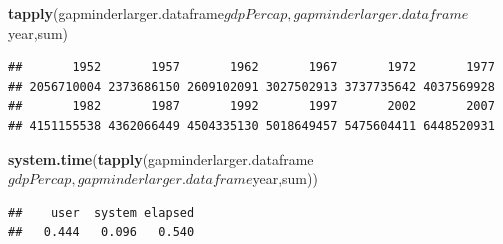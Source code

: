 \documentclass[]{article}
\newenvironment{Shaded}{\begin{snugshade}}{\end{snugshade}}
\newcommand{\KeywordTok}[1]{\textcolor[rgb]{0.13,0.29,0.53}{\textbf{{#1}}}}
\newcommand{\NormalTok}[1]{{#1}}
\begin{document}
\begin{Shaded}
\begin{Highlighting}[]
\KeywordTok{tapply}\NormalTok{(gapminderlarger.dataframe$gdpPercap,gapminderlarger.dataframe$year,sum)}
\end{Highlighting}
\end{Shaded}

\begin{verbatim}
##       1952       1957       1962       1967       1972       1977 
## 2056710004 2373686150 2609102091 3027502913 3737735642 4037569928 
##       1982       1987       1992       1997       2002       2007 
## 4151155538 4362066449 4504335130 5018649457 5475604411 6448520931
\end{verbatim}

\begin{Shaded}
\begin{Highlighting}[]
\KeywordTok{system.time}\NormalTok{(}\KeywordTok{tapply}\NormalTok{(gapminderlarger.dataframe$gdpPercap,gapminderlarger.dataframe$year,sum))}
\end{Highlighting}
\end{Shaded}

\begin{verbatim}
##    user  system elapsed 
##   0.444   0.096   0.540
\end{verbatim}
\end{document}
